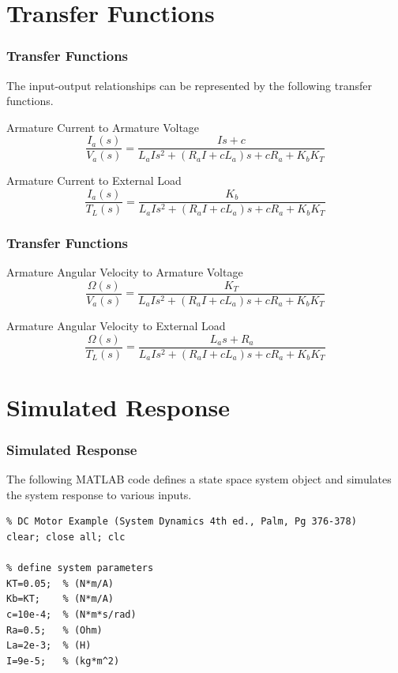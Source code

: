 \documentclass[fleqn]{beamer}                  %
\newcommand{\sectiontitleIV}{Transfer Functions}
\newcommand{\sectiontitleV}{Simulated Response}
\begin{document}
\section{\sectiontitleIV}

	\begin{frame}[label=sectionIV] \small
		\frametitle{\sectiontitleIV}
		The input-output relationships can be represented by the following transfer functions.

		Armature Current to Armature Voltage
		\[\frac{I_a\left(s\right)}{V_a\left(s\right)}=\frac{Is+c}{L_aIs^2+\left(R_aI+cL_a\right)s+cR_a+K_bK_T}\]
		
		Armature Current to External Load
		\[\frac{I_a\left(s\right)}{T_L\left(s\right)}=\frac{K_b}{L_aIs^2+\left(R_aI+cL_a\right)s+cR_a+K_bK_T}\]

	\end{frame}	

	\begin{frame}[label=sectionIV] \small
		\frametitle{\sectiontitleIV}

		Armature Angular Velocity to Armature Voltage
		\[\frac{\Omega\left(s\right)}{V_a\left(s\right)}=\frac{K_T}{L_aIs^2+\left(R_aI+cL_a\right)s+cR_a+K_bK_T}\]
		
		Armature Angular Velocity to External Load
		\[\frac{\Omega\left(s\right)}{T_L\left(s\right)}=\frac{L_as+R_a}{L_aIs^2+\left(R_aI+cL_a\right)s+cR_a+K_bK_T}\]

	\end{frame}	

\section{\sectiontitleV}

	\begin{frame}[containsverbatim,label=sectionV] \small
		\frametitle{\sectiontitleV}

		The following MATLAB code defines a state space system object and simulates the system response to various inputs.
		
		\begin{lstlisting}
% DC Motor Example (System Dynamics 4th ed., Palm, Pg 376-378)  
clear; close all; clc

% define system parameters
KT=0.05;  % (N*m/A)
Kb=KT;    % (N*m/A)
c=10e-4;  % (N*m*s/rad)   
Ra=0.5;   % (Ohm)
La=2e-3;  % (H)
I=9e-5;   % (kg*m^2)
		\end{lstlisting}
\end{frame}	
\end{document}
